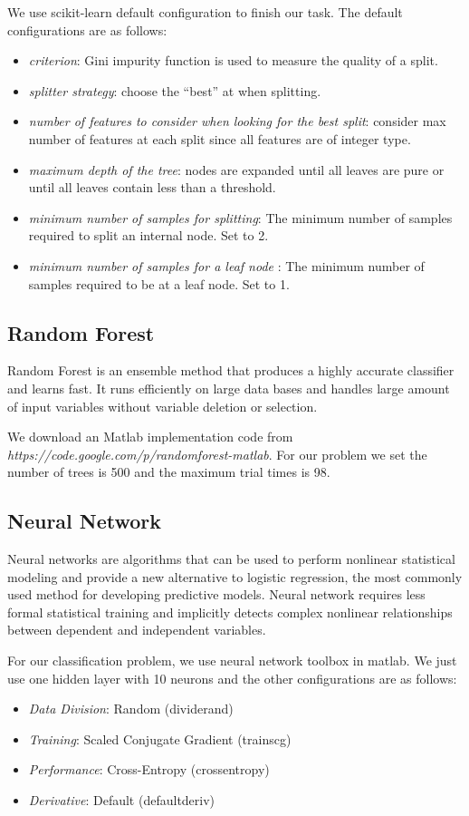 \documentclass[letterpaper,11pt,twocolumn]{article}
\begin{document}
We use scikit-learn default configuration to finish our task. The default configurations are as follows:

\begin{itemize}
\item \emph{criterion}: Gini impurity function is used to measure the quality of a split.
\item \emph{splitter strategy}: choose the “best” at when splitting.
\item \emph{number of features to consider when looking for the best split}: consider max number of features at each split since all features are of integer type.
\item \emph{maximum depth of the tree}: nodes are expanded until all leaves are pure or until all leaves contain less than a threshold.
\item \emph{minimum number of samples for splitting}: The minimum number of samples required to split an internal node. Set to 2.
\item \emph{minimum number of samples for a leaf node }: The minimum number of samples required to be at a leaf node. Set to 1.

\end{itemize}
\subsection{Random Forest}
Random Forest is an ensemble method that produces a highly accurate classifier and learns fast. It runs efficiently on large data bases and handles large amount of input variables without variable deletion or selection.

We download an Matlab implementation code from \emph{https://code.google.com/p/randomforest-matlab}. For our problem we set the number of trees is 500 and the maximum trial times is 98.

\subsection{Neural Network}
Neural networks are algorithms that can be used to perform nonlinear statistical modeling and provide a new alternative to logistic regression, the most commonly used method for developing predictive models. Neural network requires less formal statistical training and implicitly detects complex nonlinear relationships between dependent and independent variables.

For our classification problem, we use neural network toolbox in matlab. We just use one hidden layer with 10 neurons and the other configurations are as follows:
\begin{itemize}
\item \emph{Data Division}: Random (dividerand)
\item \emph{Training}: Scaled Conjugate Gradient (trainscg)
\item \emph{Performance}: Cross-Entropy (crossentropy)
\item \emph{Derivative}: Default (defaultderiv)
\end{itemize}
\end{document}
